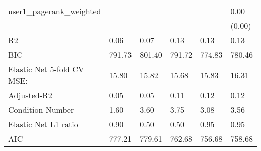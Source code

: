 \begin{table}
\begin{center}
\begin{tabular}{llllll}
user1_pagerank_weighted                        &         &         &         &         & 0.00      \\
                                               &         &         &         &         & (0.00)    \\
R2                                             & 0.06    & 0.07    & 0.13    & 0.13    & 0.13      \\
BIC                                            & 791.73  & 801.40  & 791.72  & 774.83  & 780.46    \\
Elastic Net 5-fold CV MSE:                     & 15.80   & 15.82   & 15.68   & 15.83   & 16.31     \\
Adjusted-R2                                    & 0.05    & 0.05    & 0.11    & 0.12    & 0.12      \\
Condition Number                               & 1.60    & 3.60    & 3.75    & 3.08    & 3.56      \\
Elastic Net L1 ratio                           & 0.90    & 0.50    & 0.50    & 0.95    & 0.95      \\
AIC                                            & 777.21  & 779.61  & 762.68  & 756.68  & 758.68    \\
\hline
\end{tabular}
\end{center}
\end{table}